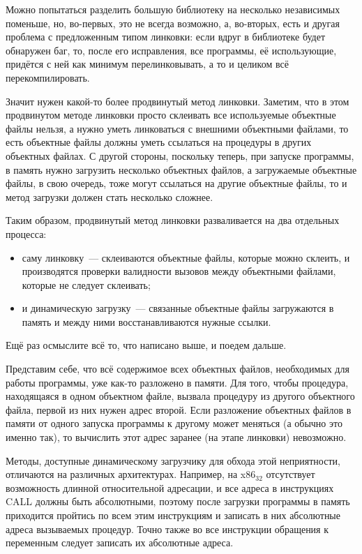 Можно попытаться разделить большую библиотеку на несколько независимых поменьше, но, во-первых, это не всегда возможно, а, во-вторых, есть и другая проблема с предложенным типом линковки: если вдруг в библиотеке будет обнаружен баг, то, после его исправления, все программы, её использующие, придётся с ней как минимум перелинковывать, а то и целиком всё перекомпилировать.

Значит нужен какой-то более продвинутый метод линковки.
Заметим, что в этом продвинутом методе линковки просто склеивать все используемые объектные файлы нельзя, а нужно уметь линковаться с внешними объектными файлами, то есть объектные файлы должны уметь ссылаться на процедуры в других объектных файлах.
С другой стороны, поскольку теперь, при запуске программы, в память нужно загрузить несколько объектных файлов, а загружаемые объектные файлы, в свою очередь, тоже могут ссылаться на другие объектные файлы, то и метод загрузки должен стать несколько сложнее.

Таким образом, продвинутый метод линковки разваливается на два отдельных процесса:
\begin{itemize}
    \item саму линковку~--- склеиваются объектные файлы, которые можно склеить, и производятся проверки валидности вызовов между объектными файлами, которые не следует склеивать;
    \item и динамическую загрузку~--- связанные объектные файлы загружаются в память и между ними восстанавливаются нужные ссылки.
\end{itemize}

Ещё раз осмыслите всё то, что написано выше, и поедем дальше.

Представим себе, что всё содержимое всех объектных файлов, необходимых для работы программы, уже как-то разложено в памяти.
Для того, чтобы процедура, находящаяся в одном объектном файле, вызвала процедуру из другого объектного файла, первой из них нужен адрес второй.
Если разложение объектных файлов в памяти от одного запуска программы к другому может меняться (а обычно это именно так), то вычислить этот адрес заранее (на этапе линковки) невозможно.

Методы, доступные динамическому загрузчику для обхода этой неприятности, отличаются на различных архитектурах.
Например, на x$86_{32}$ отсутствует возможность длинной относительной адресации, и все адреса в инструкциях CALL должны быть абсолютными, поэтому после загрузки программы в память приходится пройтись по всем этим инструкциям и записать в них абсолютные адреса вызываемых процедур.
Точно также во все инструкции обращения к переменным следует записать их абсолютные адреса.

